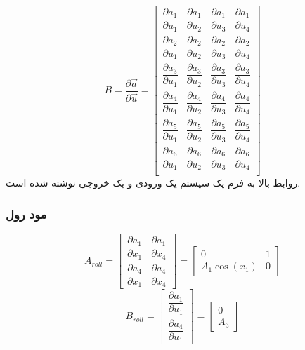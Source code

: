 \begin{equation}
	B = \dfrac{\partial \vec a}{\partial \vec u} = 
	\begin{bmatrix}
		\dfrac{\partial  a_1}{\partial  u_1}&
		\dfrac{\partial  a_1}{\partial  u_2}&
		\dfrac{\partial  a_1}{\partial  u_3}&
		\dfrac{\partial  a_1}{\partial  u_4}
		\\[1em]
		\dfrac{\partial  a_2}{\partial  u_1}&
		\dfrac{\partial  a_2}{\partial  u_2}&
		\dfrac{\partial  a_2}{\partial  u_3}&
		\dfrac{\partial  a_2}{\partial  u_4}
		\\[1em]
		\dfrac{\partial  a_3}{\partial  u_1}&
		\dfrac{\partial  a_3}{\partial  u_2}&
		\dfrac{\partial  a_3}{\partial  u_3}&
		\dfrac{\partial  a_3}{\partial  u_4}
		\\[1em]
		\dfrac{\partial  a_4}{\partial  u_1}&
		\dfrac{\partial  a_4}{\partial  u_2}&
		\dfrac{\partial  a_4}{\partial  u_3}&
		\dfrac{\partial  a_4}{\partial  u_4}
		\\[1em]
		\dfrac{\partial  a_5}{\partial  u_1}&
		\dfrac{\partial  a_5}{\partial  u_2}&
		\dfrac{\partial  a_5}{\partial  u_3}&
		\dfrac{\partial  a_5}{\partial  u_4}
		\\[1em]
		\dfrac{\partial  a_6}{\partial  u_1}&
		\dfrac{\partial  a_6}{\partial  u_2}&
		\dfrac{\partial  a_6}{\partial  u_3}&
		\dfrac{\partial  a_6}{\partial  u_4}
		\\[1em]
	\end{bmatrix}
\end{equation}
روابط بالا به فرم یک سیستم یک ورودی و یک خروجی نوشته ‌شده ‌است.
\subsubsection{مود رول}
\begin{equation}
	A_{roll} = \begin{bmatrix}
		\dfrac{\partial  a_1}{\partial  x_1}& \dfrac{\partial  a_1}{\partial  x_4}
		\\[1em]
		\dfrac{\partial  a_4}{\partial  x_1}& \dfrac{\partial  a_4}{\partial  x_4}
	\end{bmatrix} = 
	\begin{bmatrix}
		0 & 1\\
		A_1\cos(x_1) & 0
	\end{bmatrix}
\end{equation}
\begin{equation}
	B_{roll} = \begin{bmatrix}
		\dfrac{\partial  a_1}{\partial  u_1}
		\\[1em]
		\dfrac{\partial  a_4}{\partial  u_1}
	\end{bmatrix} = 
	\begin{bmatrix}
		0\\
		A_3
	\end{bmatrix}
\end{equation}

